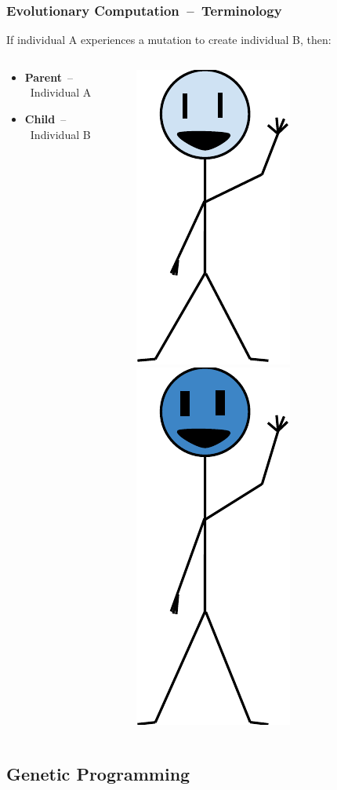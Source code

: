 \documentclass{beamer}
\newcommand{\linespace}{\vskip 0.25cm}
\begin{document}
\begin{frame}
	\frametitle{Evolutionary Computation~--~Terminology}
	If individual A experiences a mutation to create individual B, then:
	\begin{columns}
		\begin{column}{.6\textwidth}
			\begin{itemize}
				\pause
				\item \textbf{Parent}~--~Individual A
				\linespace
				\linespace
				\linespace
				\linespace
				\pause
				\item \textbf{Child}~--~Individual B
			\end{itemize}
		\end{column}
		\begin{column}{.4\textwidth}
			\pause[2]
			\includegraphics[height=.4\textwidth]{Illustrations/individual.PDF}
			\linespace
			\pause[3]
			\includegraphics[height=.6\textwidth]{Illustrations/child.PDF}
		\end{column}
	\end{columns}
\end{frame}

\subsection{Genetic Programming}
\end{document}
